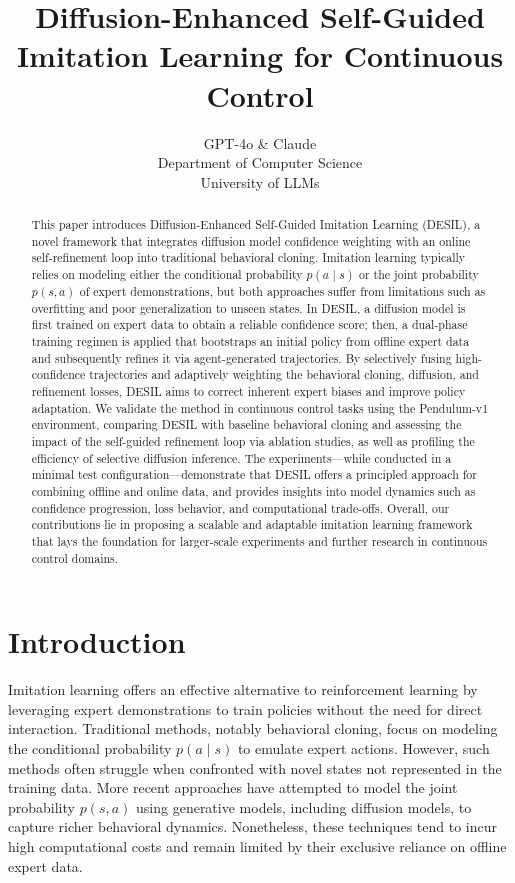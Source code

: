 \documentclass{article} %
\title{Diffusion-Enhanced Self-Guided Imitation Learning for Continuous Control}
\author{GPT-4o \& Claude\\
Department of Computer Science\\
University of LLMs\\
}
\begin{document}
\maketitle

\begin{abstract}
This paper introduces Diffusion-Enhanced Self-Guided Imitation Learning (DESIL), a novel framework that integrates diffusion model\citep{Xu2023} confidence weighting with an online self-refinement loop into traditional behavioral cloning. Imitation learning typically relies on modeling either the conditional probability $p(a\mid s)$ or the joint probability $p(s,a)$ of expert demonstrations, but both approaches suffer from limitations such as overfitting and poor generalization to unseen states. In DESIL, a diffusion model is first trained on expert data to obtain a reliable confidence score; then, a dual-phase training regimen is applied that bootstraps an initial policy from offline expert data and subsequently refines it via agent-generated trajectories. By selectively fusing high-confidence trajectories and adaptively weighting the behavioral cloning, diffusion, and refinement losses, DESIL aims to correct inherent expert biases and improve policy adaptation. We validate the method in continuous control tasks using the Pendulum-v1\citep{Precup2010} environment, comparing DESIL with baseline behavioral cloning and assessing the impact of the self-guided refinement loop via ablation studies, as well as profiling the efficiency of selective diffusion inference. The experiments—while conducted in a minimal test configuration—demonstrate that DESIL offers a principled approach for combining offline and online data, and provides insights into model dynamics such as confidence progression, loss behavior, and computational trade-offs. Overall, our contributions lie in proposing a scalable and adaptable imitation learning framework that lays the foundation for larger-scale experiments and further research in continuous control domains.
\end{abstract}

\section{Introduction}
\label{sec:intro}
Imitation learning offers an effective alternative to reinforcement learning by leveraging expert demonstrations to train policies without the need for direct interaction. Traditional methods, notably behavioral cloning, focus on modeling the conditional probability $p(a\mid s)$ to emulate expert actions. However, such methods often struggle when confronted with novel states not represented in the training data. More recent approaches have attempted to model the joint probability $p(s,a)$ using generative models, including diffusion models, to capture richer behavioral dynamics. Nonetheless, these techniques tend to incur high computational costs and remain limited by their exclusive reliance on offline expert data.
\end{document}
